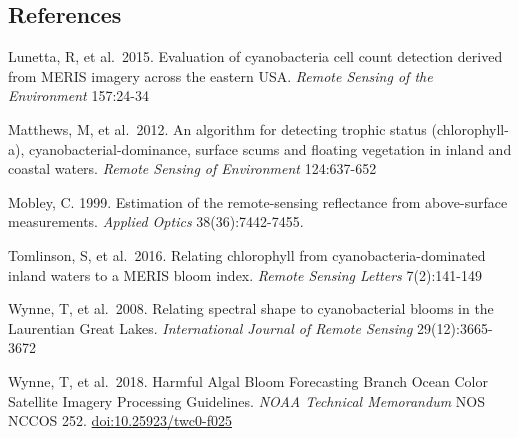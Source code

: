 \documentclass[
]{article}
\begin{document}
\hypertarget{references}{%
\subsection{References}\label{references}}

Lunetta, R, et al.~2015. Evaluation of cyanobacteria cell count
detection derived from MERIS imagery across the eastern USA.
\emph{Remote Sensing of the Environment} 157:24-34

Matthews, M, et al.~2012. An algorithm for detecting trophic status
(chlorophyll-a), cyanobacterial-dominance, surface scums and floating
vegetation in inland and coastal waters. \emph{Remote Sensing of
Environment} 124:637-652

Mobley, C. 1999. Estimation of the remote-sensing reflectance from
above-surface measurements. \emph{Applied Optics} 38(36):7442-7455.

Tomlinson, S, et al.~2016. Relating chlorophyll from
cyanobacteria-dominated inland waters to a MERIS bloom index.
\emph{Remote Sensing Letters} 7(2):141-149

Wynne, T, et al.~2008. Relating spectral shape to cyanobacterial blooms
in the Laurentian Great Lakes. \emph{International Journal of Remote
Sensing} 29(12):3665-3672

Wynne, T, et al.~2018. Harmful Algal Bloom Forecasting Branch Ocean
Color Satellite Imagery Processing Guidelines. \emph{NOAA Technical
Memorandum} NOS NCCOS 252. \url{doi:10.25923/twc0-f025}
\end{document}

